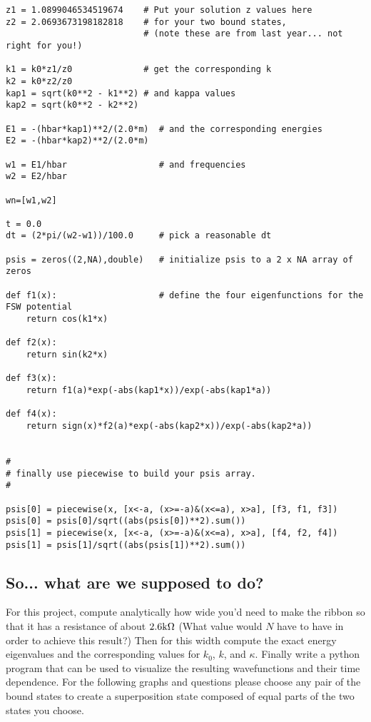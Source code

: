 \documentclass[11pt]{article} %
\begin{document}
\begin{verbatim}
z1 = 1.0899046534519674    # Put your solution z values here
z2 = 2.0693673198182818    # for your two bound states, 
                           # (note these are from last year... not right for you!)

k1 = k0*z1/z0              # get the corresponding k
k2 = k0*z2/z0              
kap1 = sqrt(k0**2 - k1**2) # and kappa values
kap2 = sqrt(k0**2 - k2**2)

E1 = -(hbar*kap1)**2/(2.0*m)  # and the corresponding energies
E2 = -(hbar*kap2)**2/(2.0*m)

w1 = E1/hbar                  # and frequencies
w2 = E2/hbar

wn=[w1,w2]

t = 0.0
dt = (2*pi/(w2-w1))/100.0     # pick a reasonable dt

psis = zeros((2,NA),double)   # initialize psis to a 2 x NA array of zeros

def f1(x):                    # define the four eigenfunctions for the FSW potential
    return cos(k1*x)
    
def f2(x):
    return sin(k2*x)
    
def f3(x):
    return f1(a)*exp(-abs(kap1*x))/exp(-abs(kap1*a))
    
def f4(x):
    return sign(x)*f2(a)*exp(-abs(kap2*x))/exp(-abs(kap2*a))
    

#    
# finally use piecewise to build your psis array.
#
    
psis[0] = piecewise(x, [x<-a, (x>=-a)&(x<=a), x>a], [f3, f1, f3])   
psis[0] = psis[0]/sqrt((abs(psis[0])**2).sum())
psis[1] = piecewise(x, [x<-a, (x>=-a)&(x<=a), x>a], [f4, f2, f4])
psis[1] = psis[1]/sqrt((abs(psis[1])**2).sum())
\end{verbatim}

\subsection*{So... what are we supposed to do?}

For this project, compute analytically how wide you'd need to make the ribbon so that it has a resistance of about $2.6 {\rm k\Omega}$ (What value would $N$ have to have in order to achieve this result?) Then for this width compute the exact energy eigenvalues and the corresponding values for $k_0$, $k$, and $\kappa$. Finally write a python program that can be used to visualize the resulting wavefunctions and their time dependence. For the following graphs and questions please choose any pair of the bound states to create a superposition state composed of equal parts of the two states you choose.
\end{document}
